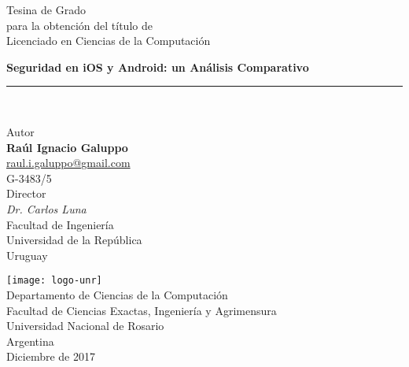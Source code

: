 \begin{titlepage}
    \begin{center}
        \LARGE
        Tesina de Grado\\
        \Large
        para la obtenci\'on del t\'itulo de\\
        Licenciado en Ciencias de la Computaci\'on
        \vfill
        
        \Huge
        \textbf{Seguridad en iOS y Android: un Análisis Comparativo}
        \rule{\textwidth}{1pt}\\
        \vspace{0.5cm}

        \large
        Autor\\
        \Large
        \textbf{Raúl Ignacio Galuppo}\\
        \normalsize
        \href{mailto:raul.i.galuppo@gmail.com}{raul.i.galuppo@gmail.com}\\
        G-3483/5\\
        \vspace{0.5cm}
        \large
        Director\\
        \Large
        \emph{Dr. Carlos Luna}\\
        \vspace{0.1cm}
        \normalsize
        Facultad de Ingeniería\\
        Universidad de la República\\
        Uruguay\\
        \vfill
        
        \texttt{[image: logo-unr]}\\
        \Large
        Departamento de Ciencias de la Computación\\
        Facultad de Ciencias Exactas, Ingeniería y Agrimensura\\
        Universidad Nacional de Rosario\\
        Argentina\\
        \vspace{0.5cm}
        Diciembre de 2017
    \end{center}
\end{titlepage}
